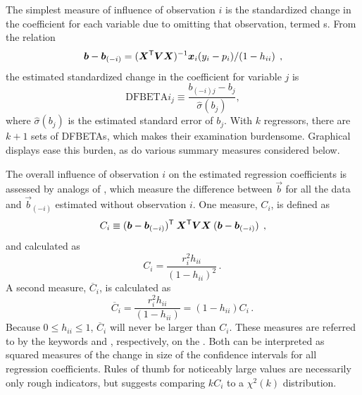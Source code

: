 The simplest measure of influence of observation $i$ is the standardized change in the coefficient for each variable due to omitting that observation,
termed s.  From the relation \citep[p. 716]{Pregibon:81}
\begin{equation*}%
 \vec{b} -  \vec{b}_{(-i)} = (\mat{X}\trans \mat{V} \mat{X})^{-1} \vec{x}_i (y_i - p_i) / (1 - h_{ii})
 \comma
\end{equation*}
the estimated standardized change in the coefficient for variable $j$ is
\begin{equation}\label{eq:dfbeta}
 \mbox{DFBETA}i_j \equiv \frac{b_{(-i)j} -  b_j } {\hat{\sigma} (b_j)}
 \comma
\end{equation}
where $\hat{\sigma} (b_j)$ is the estimated standard error of $b_j$.
With $k$ regressors, there are $k+1$ sets of DFBETAs, which makes their examination burdensome.
Graphical displays ease this burden, as do various summary measures
considered below.

The overall influence of observation $i$ on the estimated regression
coefficients is assessed by analogs of , which measure
the difference between $\vec{b}$ for all the data and
$\vec{b}_{(-i)}$ estimated without observation $i$.
One measure, $C_i$, is defined as
\begin{equation*}%
C_i \equiv ( \vec{b} - \vec{b}_{(-i)} )\trans \:
    \mat{X}\trans \mat{V} \mat{X} \:
     ( \vec{b} - \vec{b}_{(-i)} )
	  \comma
\end{equation*}
and calculated as
\begin{equation}\label{eq:cookd2}
 C_i = \frac{r_i^2 h_{ii}} {(1-h_{ii} )^2}
 \period
\end{equation}
A second measure, $\overline{C}_i$, is calculated as
\begin{equation}\label{eq:cookd3}
 \overline{C}_i = \frac{r_i^2 h_{ii}} {(1-h_{ii} )} = (1-h_{ii} ) C_i
 \period
\end{equation}
Because $0 \le h_{ii} \le 1$, $\overline{C}_i$ will never be larger than $C_i$.
These measures are referred to by the keywords  and
, respectively, on the .
Both can be interpreted as squared measures of the change in
size of the confidence intervals for all regression coefficients.
Rules of thumb for noticeably large values are necessarily only
rough indicators, but \citet{Johnson:85} suggests comparing $k C_i$
to a $\chi^2 (k)$ distribution.

